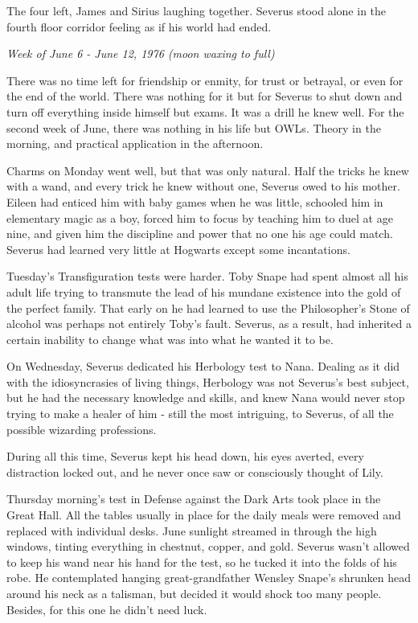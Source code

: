 \documentclass[a4paper,11pt]{article}
\begin{document}
The four left, James and Sirius laughing together. Severus stood alone in the fourth floor corridor feeling as if his world had ended.

\emph{Week of June 6 - June 12, 1976 (moon waxing to full)}

There was no time left for friendship or enmity, for trust or betrayal, or even for the end of the world. There was nothing for it but for Severus to shut down and turn off everything inside himself but exams. It was a drill he knew well. For the second week of June, there was nothing in his life but OWLs. Theory in the morning, and practical application in the afternoon.

Charms on Monday went well, but that was only natural. Half the tricks he knew with a wand, and every trick he knew without one, Severus owed to his mother. Eileen had enticed him with baby games when he was little, schooled him in elementary magic as a boy, forced him to focus by teaching him to duel at age nine, and given him the discipline and power that no one his age could match. Severus had learned very little at Hogwarts except some incantations.

Tuesday's Transfiguration tests were harder. Toby Snape had spent almost all his adult life trying to transmute the lead of his mundane existence into the gold of the perfect family. That early on he had learned to use the Philosopher's Stone of alcohol was perhaps not entirely Toby's fault. Severus, as a result, had inherited a certain inability to change what was into what he wanted it to be.

On Wednesday, Severus dedicated his Herbology test to Nana. Dealing as it did with the idiosyncrasies of living things, Herbology was not Severus's best subject, but he had the necessary knowledge and skills, and knew Nana would never stop trying to make a healer of him - still the most intriguing, to Severus, of all the possible wizarding professions.

During all this time, Severus kept his head down, his eyes averted, every distraction locked out, and he never once saw or consciously thought of Lily.

Thursday morning's test in Defense against the Dark Arts took place in the Great Hall. All the tables usually in place for the daily meals were removed and replaced with individual desks. June sunlight streamed in through the high windows, tinting everything in chestnut, copper, and gold. Severus wasn't allowed to keep his wand near his hand for the test, so he tucked it into the folds of his robe. He contemplated hanging great-grandfather Wensley Snape's shrunken head around his neck as a talisman, but decided it would shock too many people. Besides, for this one he didn't need luck.
\end{document}
